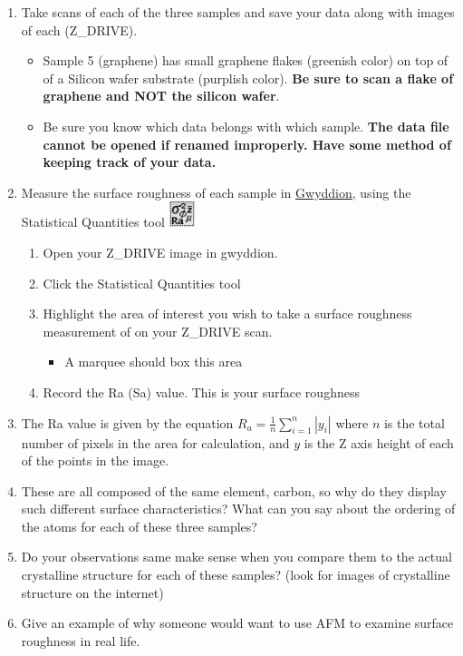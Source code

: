 \documentclass{../lab}
\begin{document}
\begin{enumerate}
    \item Take scans of each of the three samples and save your data along with images of each (Z\_DRIVE).

    \begin{itemize}
        \item Sample 5 (graphene) has small graphene flakes (greenish color) on top of of a Silicon wafer substrate (purplish color). \textbf{Be sure to scan a flake of graphene and NOT the silicon wafer}.

        \item Be sure you know which data belongs with which sample.  \textbf{The data file cannot be opened if renamed improperly. Have some method of keeping track of your data.}
    \end{itemize}

    \item Measure the surface roughness of each sample in \hyperref[subsec:Gwyddion]{Gwyddion}, using the Statistical Quantities tool \includegraphics[height=2em]{images/36.png}
    \begin{enumerate}
        \item Open your Z\_DRIVE image in gwyddion.

        \item Click the Statistical Quantities tool

        \item Highlight the area of interest you wish to take a surface roughness measurement of on your Z\_DRIVE scan.
        \begin{itemize}
            \item A marquee should box this area
        \end{itemize}

        \item Record the Ra (Sa) value. This is your surface roughness
    \end{enumerate}

    \item The Ra value is given by the equation $R_a=\frac{1}{n} \sum\limits_{i=1}^{n} |y_i|$ where $n$ is the total number of pixels in the area for calculation, and $y$ is the Z axis height of each of the points in the image.

    \item These are all composed of the same element, carbon, so why do they display such different surface characteristics? What can you say about the ordering of the atoms for each of these three samples?

    \item Do your observations same make sense when you compare them to the actual crystalline structure for each of these samples? (look for images of crystalline structure on the internet)

    \item Give an example of why someone would want to use AFM to examine surface roughness in real life.

\end{enumerate}
\end{document}
